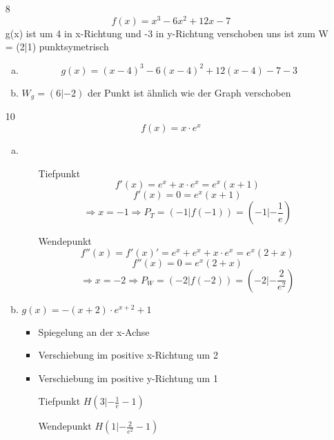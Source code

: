 \documentclass{book}
\begin{document}
\begin{itemize}
    \item[8]
        \[f(x) = x^3 - 6x^2 +12x-7\]
        g(x) ist um 4 in x-Richtung und -3 in y-Richtung verschoben uns ist zum W = (2|1) punktsymetrisch
        \begin{enumerate}[a)]
            \item \[g(x) = (x-4)^3 - 6(x-4)^2 + 12(x-4)-7 -3\]
            \item $W_g = (6|-2)$ der Punkt ist ähnlich wie der Graph verschoben
        \end{enumerate}
    \item[10]
        \[f(x) = x\cdot e^x\]
        \begin{enumerate}[a)]
            \item \hfill \break
                \begin{enumerate}
                    \item[Tiefpunkt]
                        \[f'(x) = e^x + x \cdot e^x = e^x(x+1)\]
                        \[f'(x) = 0 = e^x(x+1)\]
                        \[\Rightarrow x = -1 \Rightarrow P_T = (-1|f(-1)) = (-1| - \frac{1}{e})\]
                    \item[Wendepunkt]
                        \[f''(x) = f'(x)' = e^x +e^x + x \cdot e^x = e^x(2+x)\]
                        \[f''(x) = 0 = e^x(2+x)\]
                        \[\Rightarrow x = -2 \Rightarrow P_W = (-2|f(-2)) = (-2|- \frac{2}{e^2} )\]
                \end{enumerate}
            \item $ g(x) = -(x+2) \cdot e^{x+2} +1 $
                \begin{itemize}
                    \item Spiegelung an der x-Achse
                    \item Verschiebung im positive x-Richtung um 2
                    \item Verschiebung im positive y-Richtung um 1
                \end{itemize}
                \begin{enumerate}
                    \item[Tiefpunkt]
                        $H(3|- \frac 1{e}-1)$
                    \item[Wendepunkt]
                        $H(1|- \frac{2}{e^2}-1 )$
                \end{enumerate}
        \end{enumerate}


\end{itemize}
\end{document}
